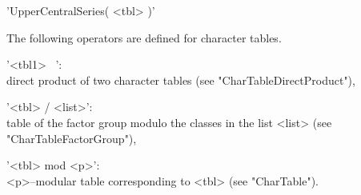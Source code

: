 'UpperCentralSeries( <tbl> )'%

%
%
%

The following operators are defined for character tables.

'<tbl1> \* \ <tbl2>': \\ direct product of two character tables
                       (see "CharTableDirectProduct"),

'<tbl> / <list>':   \\ table of the factor group modulo the classes in
                       the list <list> (see "CharTableFactorGroup"),

'<tbl> mod <p>':    \\ <p>--modular table corresponding to <tbl>
                       (see "CharTable").

%

